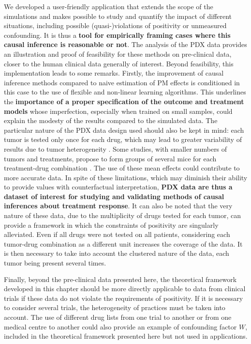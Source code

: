 \documentclass[a4paper,12pt,twoside,onecolumn,openright,final,oldfontcommands]{memoir}
\begin{document}
We developed a user-friendly application that extends the scope of the
simulations and makes possible to study and quantify the impact of
different situations, including possible (quasi-)violations of
positivity or unmeasured confounding. It is thus a \textbf{tool for
empirically framing cases where this causal inference is reasonable or
not}. The analysis of the PDX data provides an illustration and proof of
feasibility for these methods on pre-clinical data, closer to the human
clinical data generally of interest. Beyond feasibility, this
implementation leads to some remarks. Firstly, the improvement of causal
inference methods compared to naive estimation of PM effects is
conditioned in this case to the use of flexible and non-linear learning
algorithms. This underlines the \textbf{importance of a proper
specification of the outcome and treatment models} whose imperfection,
especially when trained on small samples, could explain the modesty of
the results compared to the simulated data. The particular nature of the
PDX data design used should also be kept in mind: each tumor is tested
only once for each drug, which may lead to greater variability of
results due to tumor heterogeneity \citep{gao2015high}. Some studies,
with smaller numbers of tumors and treatments, propose to form groups of
several mice for each treatment-drug combination
\citep{hidalgo2014patient}. The use of these mean effects could
contribute to more accurate data. In spite of these limitations, which
may diminish their ability to provide values with counterfactual
interpretation, \textbf{PDX data are thus a dataset of interest for
studying and validating methods of causal inferences about treatment
response}. It can also be noted that the very nature of these data, due
to the multiplicity of drugs tested for each tumor, can provide a
framework in which the constraints of positivity are singularly
alleviated. Even if all drugs were not tested on all patients,
considering each tumor-drug combination as a different unit increases
the coverage of the data. It is then necessary to take into account the
clustered nature of the data, each tumor being present several times.

Finally, beyond the pre-clinical data presented here, the theoretical
framework developed in this chapter should be more directly applicable
to data from clinical trials if these data do not violate the
requirements of positivity. If it is necessary to consider several
trials, the heterogeneity of practices must be taken into account. The
use of different drug lists from one trial to another or from one
medical centre to another could also provide an example of confounding
factor \(W\), included in the theoretical framework presented here but
not used in applications.
\end{document}
